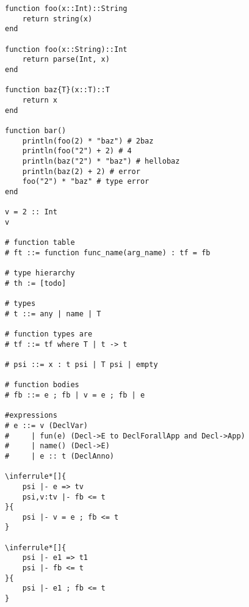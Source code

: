 \documentclass{report} %
\begin{document}


\begin{verbatim}
function foo(x::Int)::String
	return string(x)
end

function foo(x::String)::Int
	return parse(Int, x)
end

function baz{T}(x::T)::T
    return x
end

function bar()
    println(foo(2) * "baz") # 2baz
    println(foo("2") + 2) # 4
    println(baz("2") * "baz") # hellobaz
    println(baz(2) + 2) # error
    foo("2") * "baz" # type error
end

v = 2 :: Int
v

# function table
# ft ::= function func_name(arg_name) : tf = fb

# type hierarchy
# th := [todo]

# types
# t ::= any | name | T

# function types are
# tf ::= tf where T | t -> t

# psi ::= x : t psi | T psi | empty

# function bodies
# fb ::= e ; fb | v = e ; fb | e

#expressions
# e ::= v (DeclVar)
#     | fun(e) (Decl->E to DeclForallApp and Decl->App)
#     | name() (Decl->E)
#     | e :: t (DeclAnno)

\inferrule*[]{
	psi |- e => tv
	psi,v:tv |- fb <= t
}{
	psi |- v = e ; fb <= t
}

\inferrule*[]{
	psi |- e1 => t1
	psi |- fb <= t
}{
	psi |- e1 ; fb <= t
}
\end{verbatim}
\end{document}
